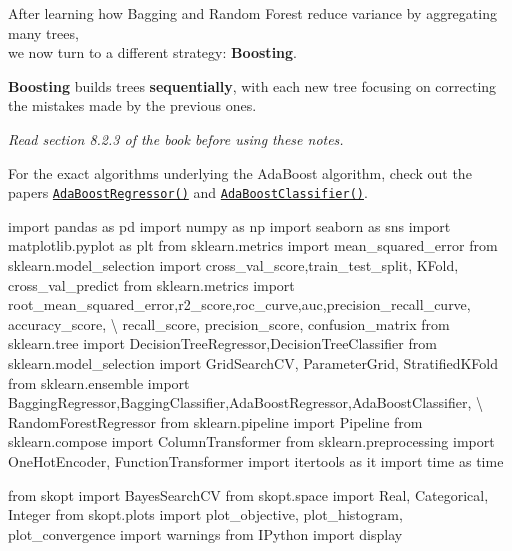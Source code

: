 \documentclass[
  letterpaper,
  DIV=11,
  numbers=noendperiod]{scrreprt}
\newenvironment{Shaded}{\begin{snugshade}}{\end{snugshade}}
\newcommand{\ImportTok}[1]{\textcolor[rgb]{0.00,0.46,0.62}{#1}}
\newcommand{\NormalTok}[1]{\textcolor[rgb]{0.00,0.23,0.31}{#1}}
\newcommand{\OperatorTok}[1]{\textcolor[rgb]{0.37,0.37,0.37}{#1}}
\begin{document}
After learning how Bagging and Random Forest reduce variance by
aggregating many trees,\\
we now turn to a different strategy: \textbf{Boosting}.

\textbf{Boosting} builds trees \textbf{sequentially}, with each new tree
focusing on correcting the mistakes made by the previous ones.

\emph{Read section 8.2.3 of the book before using these notes.}

For the exact algorithms underlying the AdaBoost algorithm, check out
the papers
\href{https://citeseerx.ist.psu.edu/document?repid=rep1&type=pdf&doi=6d8226a52ebc70c8d97ccae10a74e1b0a3908ec1}{\texttt{AdaBoostRegressor()}}
and
\href{https://dept.stat.lsa.umich.edu/~jizhu/pubs/Zhu-SII09.pdf}{\texttt{AdaBoostClassifier()}}.

\begin{Shaded}
\begin{Highlighting}[]
\ImportTok{import}\NormalTok{ pandas }\ImportTok{as}\NormalTok{ pd}
\ImportTok{import}\NormalTok{ numpy }\ImportTok{as}\NormalTok{ np}
\ImportTok{import}\NormalTok{ seaborn }\ImportTok{as}\NormalTok{ sns}
\ImportTok{import}\NormalTok{ matplotlib.pyplot }\ImportTok{as}\NormalTok{ plt}
\ImportTok{from}\NormalTok{ sklearn.metrics }\ImportTok{import}\NormalTok{ mean\_squared\_error}
\ImportTok{from}\NormalTok{ sklearn.model\_selection }\ImportTok{import}\NormalTok{ cross\_val\_score,train\_test\_split, KFold, cross\_val\_predict}
\ImportTok{from}\NormalTok{ sklearn.metrics }\ImportTok{import}\NormalTok{ root\_mean\_squared\_error,r2\_score,roc\_curve,auc,precision\_recall\_curve, accuracy\_score, }\OperatorTok{\textbackslash{}}
\NormalTok{recall\_score, precision\_score, confusion\_matrix}
\ImportTok{from}\NormalTok{ sklearn.tree }\ImportTok{import}\NormalTok{ DecisionTreeRegressor,DecisionTreeClassifier}
\ImportTok{from}\NormalTok{ sklearn.model\_selection }\ImportTok{import}\NormalTok{ GridSearchCV, ParameterGrid, StratifiedKFold}
\ImportTok{from}\NormalTok{ sklearn.ensemble }\ImportTok{import}\NormalTok{ BaggingRegressor,BaggingClassifier,AdaBoostRegressor,AdaBoostClassifier, }\OperatorTok{\textbackslash{}}
\NormalTok{RandomForestRegressor}
\ImportTok{from}\NormalTok{ sklearn.pipeline }\ImportTok{import}\NormalTok{ Pipeline}
\ImportTok{from}\NormalTok{ sklearn.compose }\ImportTok{import}\NormalTok{ ColumnTransformer}
\ImportTok{from}\NormalTok{ sklearn.preprocessing }\ImportTok{import}\NormalTok{ OneHotEncoder, FunctionTransformer}
\ImportTok{import}\NormalTok{ itertools }\ImportTok{as}\NormalTok{ it}
\ImportTok{import}\NormalTok{ time }\ImportTok{as}\NormalTok{ time}

\ImportTok{from}\NormalTok{ skopt }\ImportTok{import}\NormalTok{ BayesSearchCV}
\ImportTok{from}\NormalTok{ skopt.space }\ImportTok{import}\NormalTok{ Real, Categorical, Integer}
\ImportTok{from}\NormalTok{ skopt.plots }\ImportTok{import}\NormalTok{ plot\_objective, plot\_histogram, plot\_convergence}
\ImportTok{import}\NormalTok{ warnings}
\ImportTok{from}\NormalTok{ IPython }\ImportTok{import}\NormalTok{ display}
\end{Highlighting}
\end{Shaded}
\end{document}
